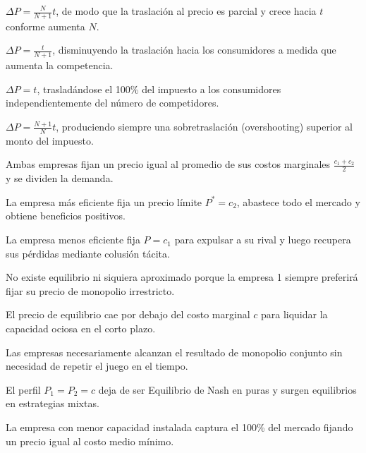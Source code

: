 \begin{opts}
    \item $\Delta P = \frac{N}{N+1} t$, de modo que la traslación al precio es parcial y crece hacia $t$ conforme aumenta $N$.
    \item $\Delta P = \frac{t}{N+1}$, disminuyendo la traslación hacia los consumidores a medida que aumenta la competencia.
    \item $\Delta P = t$, trasladándose el 100\% del impuesto a los consumidores independientemente del número de competidores.
    \item $\Delta P = \frac{N+1}{N} t$, produciendo siempre una sobretraslación (overshooting) superior al monto del impuesto.
\end{opts}

\begin{opts}
    \item Ambas empresas fijan un precio igual al promedio de sus costos marginales $\frac{c_1 + c_2}{2}$ y se dividen la demanda.
    \item La empresa más eficiente fija un precio límite $P^* = c_2$, abastece todo el mercado y obtiene beneficios positivos.
    \item La empresa menos eficiente fija $P = c_1$ para expulsar a su rival y luego recupera sus pérdidas mediante colusión tácita.
    \item No existe equilibrio ni siquiera aproximado porque la empresa 1 siempre preferirá fijar su precio de monopolio irrestricto.
\end{opts}

\begin{opts}
    \item El precio de equilibrio cae por debajo del costo marginal $c$ para liquidar la capacidad ociosa en el corto plazo.
    \item Las empresas necesariamente alcanzan el resultado de monopolio conjunto sin necesidad de repetir el juego en el tiempo.
    \item El perfil $P_1 = P_2 = c$ deja de ser Equilibrio de Nash en puras y surgen equilibrios en estrategias mixtas.
    \item La empresa con menor capacidad instalada captura el 100\% del mercado fijando un precio igual al costo medio mínimo.
\end{opts}

